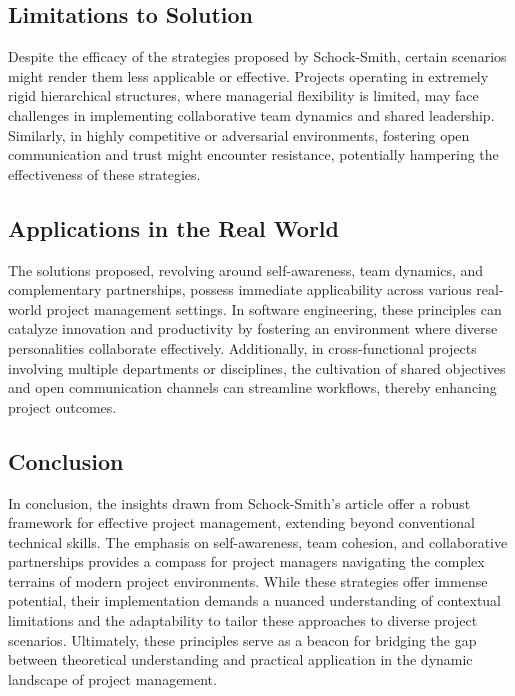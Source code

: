 \documentclass[runningheads]{llncs}
\begin{document}
\subsection{Limitations to Solution}
Despite the efficacy of the strategies proposed by Schock-Smith, certain scenarios might render them less applicable or effective. Projects operating in extremely rigid hierarchical structures, where managerial flexibility is limited, may face challenges in implementing collaborative team dynamics and shared leadership. Similarly, in highly competitive or adversarial environments, fostering open communication and trust might encounter resistance, potentially hampering the effectiveness of these strategies.

\subsection{Applications in the Real World}
The solutions proposed, revolving around self-awareness, team dynamics, and complementary partnerships, possess immediate applicability across various real-world project management settings. In software engineering, these principles can catalyze innovation and productivity by fostering an environment where diverse personalities collaborate effectively. Additionally, in cross-functional projects involving multiple departments or disciplines, the cultivation of shared objectives and open communication channels can streamline workflows, thereby enhancing project outcomes.

\subsection{Conclusion}
In conclusion, the insights drawn from Schock-Smith's article offer a robust framework for effective project management, extending beyond conventional technical skills. The emphasis on self-awareness, team cohesion, and collaborative partnerships provides a compass for project managers navigating the complex terrains of modern project environments. While these strategies offer immense potential, their implementation demands a nuanced understanding of contextual limitations and the adaptability to tailor these approaches to diverse project scenarios. Ultimately, these principles serve as a beacon for bridging the gap between theoretical understanding and practical application in the dynamic landscape of project management.
\end{document}
